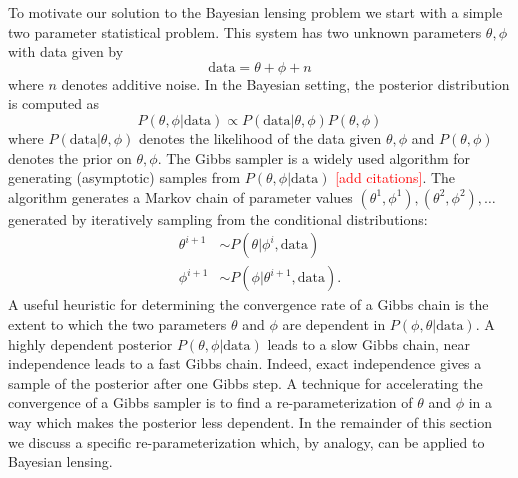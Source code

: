 \documentclass[11pt]{article}
\begin{document}
To motivate our solution to the Bayesian lensing problem we start with a simple two parameter statistical problem.  This system has two unknown parameters $\theta, \phi$ with data given by
\[\text{data} = \theta + \phi + n\]
where $n$ denotes additive noise.  In the Bayesian setting, the posterior distribution is computed as 
\begin{equation}
\label{post1}
 P(\theta,\phi|\text{data})\propto P(\text{data}|\theta, \phi) P(\theta,\phi) 
 \end{equation}
where $P(\text{data}|\theta, \phi)$ denotes the likelihood of the data given  $\theta, \phi$ and $P(\theta,\phi)$ denotes the  prior on $\theta, \phi$. 
The Gibbs sampler is a widely used algorithm for generating (asymptotic) samples from  $P(\theta, \phi|\text{data})$ \textcolor{red}{[add citations]}. The algorithm generates a Markov chain of parameter values $(\theta^{1}, \phi^{1}), (\theta^{2}, \phi^{2}),\ldots$ generated by iteratively sampling from the conditional distributions:
\begin{align*}
\theta^{i+1} &\sim P(\theta|\phi^i,\text{data})\\
\phi^{i+1}   &\sim P(\phi|\theta^{i+1},\text{data}).
\end{align*}
A useful heuristic for determining the convergence rate of a Gibbs chain is the extent to which the two parameters $\theta$ and $\phi$ are dependent in $P(\phi, \theta|\text{data})$. A highly dependent posterior $P(\theta, \phi|\text{data})$ leads to a slow Gibbs chain, near independence leads to a fast Gibbs chain. Indeed, exact independence gives a sample of the posterior after one Gibbs step.  A technique for accelerating the convergence of a Gibbs sampler is to find a  re-parameterization of $\theta$ and $\phi$ in a way which makes the posterior less dependent. In the remainder of this section we discuss a specific re-parameterization which, by analogy, can be applied to Bayesian lensing.
\end{document}
